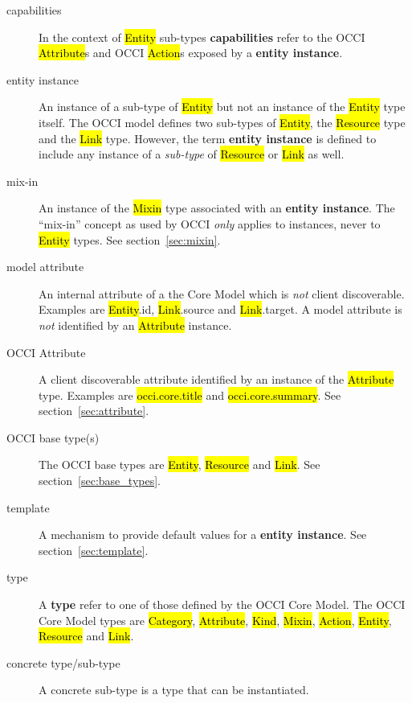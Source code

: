\documentclass[10pt,a4paper]{article}
\begin{document}
\begin{description}
  \item[capabilities] In the context of \hl{Entity} sub-types
    {\bf  capabilities} refer to the OCCI \hl{Attribute}s and OCCI \hl{Action}s
    exposed by a {\bf entity instance}.

  \item[entity instance] An instance of a sub-type of
    \hl{Entity} but not an instance of the \hl{Entity} type itself.
    The OCCI model defines two sub-types of \hl{Entity},
    the \hl{Resource} type and the \hl{Link} type.  However, the term
    {\bf entity instance} is defined to include any instance of a
    {\em sub-type} of \hl{Resource} or \hl{Link} as well.

  \item[mix-in] An instance of the \hl{Mixin} type associated with an
    {\bf entity instance}. The ``mix-in'' concept as used by OCCI
    {\em only} applies to instances, never to \hl{Entity} types.
    See section~\ref{sec:mixin}.

  \item[model attribute] An internal attribute of a the Core Model which is
    {\em not} client discoverable. Examples are \hl{Entity}.id,
    \hl{Link}.source and \hl{Link}.target. A model attribute is {\em not}
    identified by an \hl{Attribute} instance.

  \item[OCCI Attribute] A client discoverable attribute identified by an
    instance of the \hl{Attribute} type. Examples are \hl{occi.core.title}
    and \hl{occi.core.summary}. See section~\ref{sec:attribute}.

  \item[OCCI base type(s)] The OCCI base types are \hl{Entity},
    \hl{Resource} and \hl{Link}.
    See section~\ref{sec:base_types}.

  \item[template] A mechanism to provide default values for a {\bf entity
    instance}. See section~\ref{sec:template}.

  \item[type] A {\bf type} refer to one of those defined by the OCCI
    Core Model.  The OCCI Core Model types are \hl{Category},
    \hl{Attribute},
    \hl{Kind}, \hl{Mixin}, \hl{Action}, \hl{Entity}, \hl{Resource} and
    \hl{Link}.

  \item[concrete type/sub-type] A concrete sub-type is a type that can
    be instantiated.
\end{description}
\end{document}

